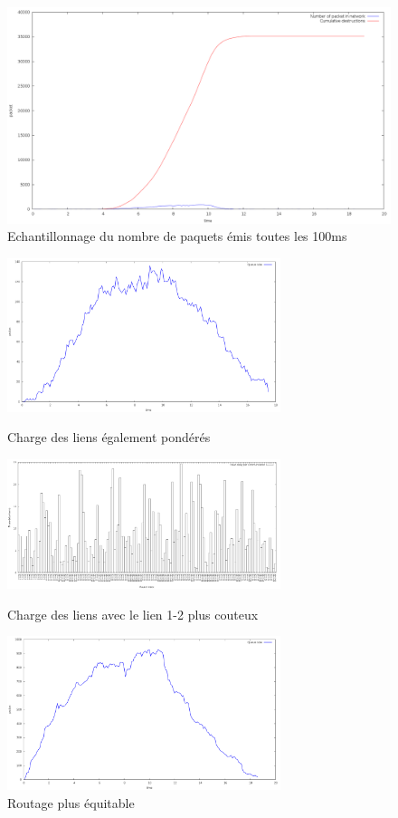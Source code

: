 \documentclass[
10pt, %
a4paper, %
oneside, %
headinclude,footinclude, %
BCOR5mm, %
]{scrartcl}
\begin{document}
\newpage
\begin{figure}
	\centerfloat
    \includegraphics[width=19cm]{png/destr_cumul.png}
	\caption{Echantillonnage du nombre de paquets émis toutes les 100ms}
   \label{total_destroys}
\end{figure}

\begin{figure}[top]
\centering
\parbox{8cm}{
\includegraphics[width=8cm]{png/routers/router3.png}
\caption{Charge des liens également pondérés}
\label{Fair}}
\qquad
\begin{minipage}{8cm}
\includegraphics[width=8cm]{png/delay.png}
\caption{Charge des liens avec le lien 1-2 plus couteux}
\label{Unfair}
\end{minipage}
\begin{minipage}{8cm}
\includegraphics[width=8cm]{png/routers/router20.png}
\caption{Routage plus équitable}
\label{Eq}
\end{minipage}
\end{figure}
\end{document}
